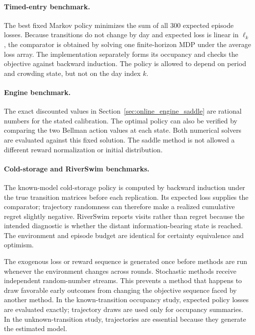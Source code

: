 \paragraph{Timed-entry benchmark.}
The best fixed Markov policy minimizes the sum of all 300 expected episode losses. Because transitions do not change by day and expected loss is linear in $\ell_k$, the comparator is obtained by solving one finite-horizon MDP under the average loss array. The implementation separately forms its occupancy and checks the objective against backward induction. The policy is allowed to depend on period and crowding state, but not on the day index $k$.

\paragraph{Engine benchmark.}
The exact discounted values in Section~\ref{sec:online_engine_saddle} are rational numbers for the stated calibration. The optimal policy can also be verified by comparing the two Bellman action values at each state. Both numerical solvers are evaluated against this fixed solution. The saddle method is not allowed a different reward normalization or initial distribution.

\paragraph{Cold-storage and RiverSwim benchmarks.}
The known-model cold-storage policy is computed by backward induction under the true transition matrices before each replication. Its expected loss supplies the comparator; trajectory randomness can therefore make a realized cumulative regret slightly negative. RiverSwim reports visits rather than regret because the intended diagnostic is whether the distant information-bearing state is reached. The environment and episode budget are identical for certainty equivalence and optimism.

The exogenous loss or reward sequence is generated once before methods are run whenever the environment changes across rounds. Stochastic methods receive independent random-number streams. This prevents a method that happens to draw favorable early outcomes from changing the objective sequence faced by another method. In the known-transition occupancy study, expected policy losses are evaluated exactly; trajectory draws are used only for occupancy summaries. In the unknown-transition study, trajectories are essential because they generate the estimated model.

